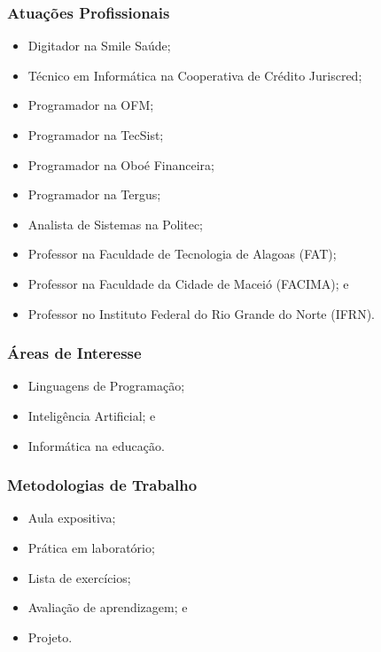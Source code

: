 \documentclass[aspectratio=169]{beamer}
\begin{document}
\begin{frame}
	\frametitle{Atuações Profissionais}

	\begin{itemize}
		\item Digitador na Smile Saúde;
		\item Técnico em Informática na Cooperativa de Crédito Juriscred;
		\item Programador na OFM;		
		\item Programador na TecSist;
		\item Programador na Oboé Financeira;
		\item Programador na Tergus;
		\item Analista de Sistemas na Politec;
		\item Professor na Faculdade de Tecnologia de Alagoas (FAT);
		\item Professor na Faculdade da Cidade de Maceió (FACIMA); e
		\item Professor no Instituto Federal do Rio Grande do Norte (IFRN).		
	\end{itemize}
\end{frame}

\begin{frame}
	\frametitle{Áreas de Interesse}
	
	\begin{itemize}
        		\item Linguagens de Programação;
		\item Inteligência Artificial; e
		\item Informática na educa\c cão.
	\end{itemize}
\end{frame}

\begin{frame}
	\frametitle{Metodologias de Trabalho}
	
	\begin{itemize}
		\item Aula expositiva;
		\item Prática em laboratório;
		\item Lista de exercícios;
	    	\item Avalia\c cão de aprendizagem; e 
		\item Projeto.
	\end{itemize}
\end{frame}
\end{document}
